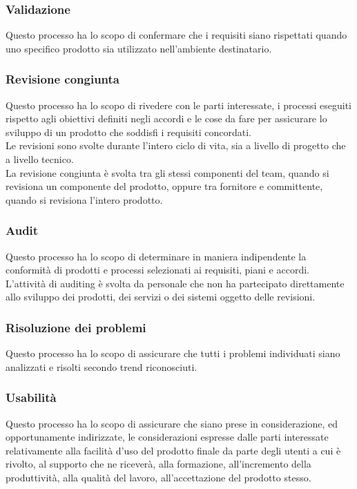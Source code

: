 \subsubsection{Validazione}
Questo processo ha lo scopo di confermare che i requisiti siano rispettati quando uno specifico prodotto sia utilizzato nell'ambiente destinatario.

\subsubsection{Revisione congiunta}
Questo processo ha lo scopo di rivedere con le parti interessate, i processi eseguiti rispetto agli obiettivi definiti negli accordi e le cose da fare per assicurare lo sviluppo di un prodotto che soddisfi i requisiti concordati.\\
Le revisioni sono svolte durante l'intero ciclo di vita\glo{}, sia a livello di progetto che a livello tecnico.\\
La revisione congiunta è svolta tra gli stessi componenti del team, quando si revisiona un componente del prodotto, oppure tra fornitore e committente, quando si revisiona l'intero prodotto.

\subsubsection{Audit}
Questo processo ha lo scopo di determinare in maniera indipendente la conformità di prodotti e processi selezionati ai requisiti, piani e accordi.\\
L'attività di auditing è svolta da personale che non ha partecipato direttamente allo sviluppo dei prodotti, dei servizi o dei sistemi oggetto delle revisioni.

\subsubsection{Risoluzione dei problemi}
Questo processo ha lo scopo di assicurare che tutti i problemi individuati siano analizzati e risolti secondo trend riconosciuti.

\subsubsection{Usabilità}
Questo processo ha lo scopo di assicurare che siano prese in considerazione, ed opportunamente indirizzate, le considerazioni espresse dalle parti interessate relativamente alla facilità d'uso del prodotto finale da parte degli utenti a cui è rivolto, al supporto che ne riceverà, alla formazione, all'incremento della produttività, alla qualità del lavoro, all'accettazione del prodotto stesso. 

